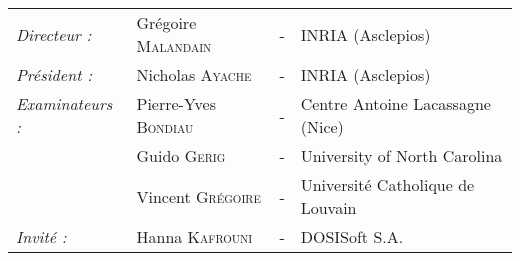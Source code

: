 \begin{titlepage}
\begin{center}
\begin{tabular}{llcl}
      \textit{Directeur :}	& Grégoire \textsc{Malandain}		& - & INRIA (Asclepios)\\
      \textit{Président :}	& Nicholas \textsc{Ayache}		& - & INRIA (Asclepios)\\
      \textit{Examinateurs :}   & Pierre-Yves \textsc{Bondiau}          & - & Centre Antoine Lacassagne (Nice)\\
      				& Guido \textsc{Gerig}			& - & University of North Carolina\\
      				& Vincent \textsc{Grégoire}		& - & Université Catholique de Louvain\\
      \textit{Invité :}		& Hanna \textsc{Kafrouni}		& - & DOSISoft S.A.
\end{tabular}
\end{center}
\end{titlepage}
\sloppy

\titlepage

